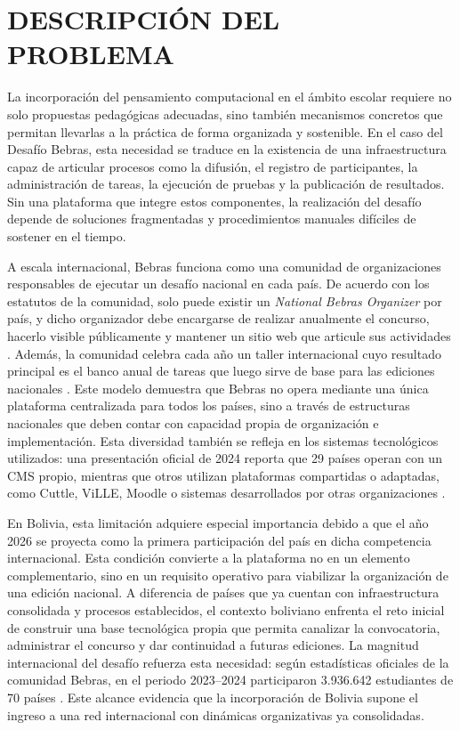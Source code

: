 \chapter{DESCRIPCIÓN DEL PROBLEMA}

La incorporación del pensamiento computacional en el ámbito escolar requiere no solo propuestas pedagógicas adecuadas, sino también mecanismos concretos que permitan llevarlas a la práctica de forma organizada y sostenible. En el caso del Desafío Bebras, esta necesidad se traduce en la existencia de una infraestructura capaz de articular procesos como la difusión, el registro de participantes, la administración de tareas, la ejecución de pruebas y la publicación de resultados. Sin una plataforma que integre estos componentes, la realización del desafío depende de soluciones fragmentadas y procedimientos manuales difíciles de sostener en el tiempo.

A escala internacional, Bebras funciona como una comunidad de organizaciones responsables de ejecutar un desafío nacional en cada país. De acuerdo con los estatutos de la comunidad, solo puede existir un \textit{National Bebras Organizer} por país, y dicho organizador debe encargarse de realizar anualmente el concurso, hacerlo visible públicamente y mantener un sitio web que articule sus actividades \parencite{bebrasstatutes2022}. Además, la comunidad celebra cada año un taller internacional cuyo resultado principal es el banco anual de tareas que luego sirve de base para las ediciones nacionales \parencite{bebrasstatutes2022}. Este modelo demuestra que Bebras no opera mediante una única plataforma centralizada para todos los países, sino a través de estructuras nacionales que deben contar con capacidad propia de organización e implementación. Esta diversidad también se refleja en los sistemas tecnológicos utilizados: una presentación oficial de 2024 reporta que 29 países operan con un CMS propio, mientras que otros utilizan plataformas compartidas o adaptadas, como Cuttle, ViLLE, Moodle o sistemas desarrollados por otras organizaciones \parencite{bebrasstats2024}.

En Bolivia, esta limitación adquiere especial importancia debido a que el año 2026 se proyecta como la primera participación del país en dicha competencia internacional. Esta condición convierte a la plataforma no en un elemento complementario, sino en un requisito operativo para viabilizar la organización de una edición nacional. A diferencia de países que ya cuentan con infraestructura consolidada y procesos establecidos, el contexto boliviano enfrenta el reto inicial de construir una base tecnológica propia que permita canalizar la convocatoria, administrar el concurso y dar continuidad a futuras ediciones. La magnitud internacional del desafío refuerza esta necesidad: según estadísticas oficiales de la comunidad Bebras, en el periodo 2023--2024 participaron 3.936.642 estudiantes de 70 países \parencite{bebrasstats2024}. Este alcance evidencia que la incorporación de Bolivia supone el ingreso a una red internacional con dinámicas organizativas ya consolidadas.

